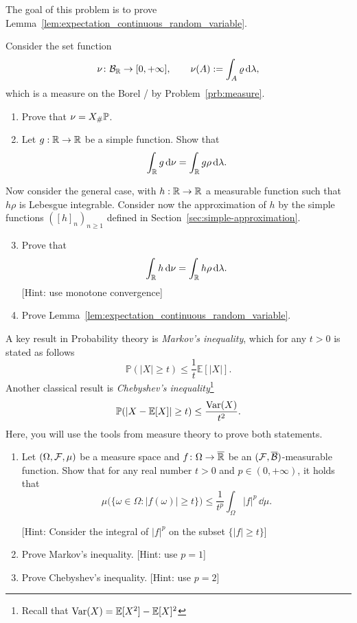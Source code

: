 \begin{problem}\label{prb:expectation_continuous_random_variable}
The goal of this problem is to prove Lemma~\ref{lem:expectation_continuous_random_variable}. 

Consider the set function
\[
	\nu\colon \mathcal B_{\mathbb R} \to [0,+\infty],\qquad\nu(A) := \int_A \varrho\, \mathrm{d} \lambda,
\]
which is a measure on the Borel \sigalg/ by Problem~\ref{prb:measure}.
\begin{enumerate}[label=(\alph*)]
\item Prove that $\nu = X_\# \mathbb P$.
\item Let $g : \mathbb R \to \mathbb R$ be a simple function. Show that
\[
	\int_{\mathbb R} g \, \mathrm{d} \nu = \int_{\mathbb R} g \rho \, \mathrm{d} \lambda.
\]
\end{enumerate}

Now consider the general case, with $h : \mathbb R \to \mathbb R$ a measurable function such that $h \rho$ is Lebesgue integrable. Consider now the approximation of $h$ by the simple functions $([h]_n)_{n \ge 1}$ defined in Section~\ref{sec:simple-approximation}.
\begin{enumerate}[label=(\alph*)]
\setcounter{enumi}{2}
\item Prove that 
\[
	\int_{\mathbb R} h \, \mathrm{d} \nu = \int_{\mathbb R} h \rho \, \mathrm{d} \lambda.
\]
[Hint: use monotone convergence]
\item Prove Lemma~\ref{lem:expectation_continuous_random_variable}.
\end{enumerate}
\end{problem}

\begin{problem}\label{prb:markov_chebyshev}
A key result in Probability theory is \emph{Markov's inequality}, which for any $t>0$ is stated as follows
\[
	\mathbb{P}(|X| \geq t) \leq \frac{1}{t} \mathbb{E}[|X|].
\]
Another classical result is \emph{Chebyshev's inequality}\footnote{Recall that $\mathrm{Var}(X) = \mathbb E[X^2] - \mathbb E[X]^2$}
\[
	\mathbb P(|X - \mathbb E[X]| \ge t) \le \frac{\mathrm{Var}(X)}{t^2}.
\]
Here, you will use the tools from measure theory to prove both statements.
\begin{enumerate}[label=(\alph*)]
\item Let $(\Omega,\mathcal F,\mu)$ be a measure space and $f\colon \Omega\to \overline{\mathbb R}$ be an $(\mathcal F,\overline{\mathcal B})$-measurable function. Show that for any real number $t>0$ and $p\in(0,+\infty)$, it holds that
\[
	\mu\bigl(\{\omega\in\Omega : |f(\omega)|\ge t\}\bigr) \le \frac{1}{t^p}\int_\Omega |f|^p\,\dd\mu.
\]

[Hint: Consider the integral of $|f|^p$ on the subset $\{|f|\ge t\}$]
\item Prove Markov's inequality. [Hint: use $p = 1$]
\item Prove Chebyshev's inequality. [Hint: use $p = 2$]
\end{enumerate}
\end{problem}

\begin{problem}\label{prb:construction_multivatiate_rv}

\end{problem}
